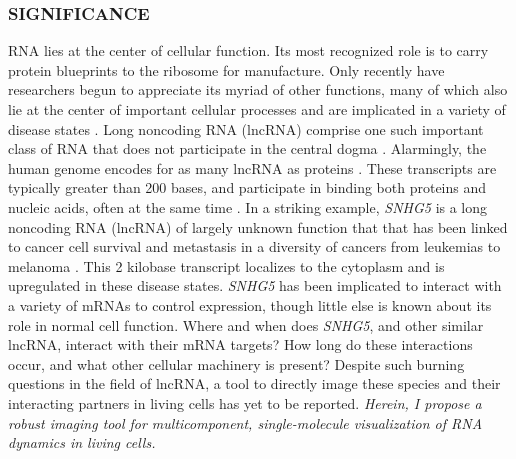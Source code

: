 

\subsubsection*{SIGNIFICANCE}
RNA lies at the center of cellular function. Its most recognized role is to carry protein blueprints to the ribosome for manufacture.
Only recently have researchers begun to appreciate its myriad of other functions, many of which also lie at the center of important cellular processes and are implicated in a variety of disease states \cite{CechNoncodingRNARevolution2014,DellaRagioneNoncodingRNAschromatin2014,AnastasiadouNoncodingRNAnetworks2018}.
Long noncoding RNA (lncRNA) comprise one such important class of RNA that does not participate in the central dogma \cite{RinnGenomeRegulationLong2012}. Alarmingly, the human genome encodes for as many lncRNA as proteins \cite{Rinntranscriptionalactivityhuman2003,RinnGenomeRegulationLong2012}.
These transcripts are typically greater than 200 bases, and participate in binding both proteins and nucleic acids, often at the same time \cite{AnastasiadouNoncodingRNAnetworks2018,RinnGenomeRegulationLong2012}.
In a striking example, \textit{SNHG5} is a long noncoding RNA (lncRNA) of largely unknown function that that has been linked to cancer cell survival and metastasis in a diversity of cancers from leukemias to melanoma \cite{TanakaRitsukoIntronicU50small2001,DamasSNHG5promotescolorectal2016,ZhaoLongnoncodingRNA2016,HeLncRNASNHG5regulates2017,YanSNHG5promotesproliferation2018,MalncRNASNHG5associated2018,ShenLncRNASNHG5miR26a2018,ZhengLongnoncodingRNA2018}.
This 2 kilobase transcript localizes to the cytoplasm and is upregulated in these disease states.
\textit{SNHG5} has been implicated to interact with a variety of mRNAs to control expression, though little else is known about its role in normal cell function.
Where and when does \textit{SNHG5}, and other similar lncRNA, interact with their mRNA targets?
How long do these interactions occur, and what other cellular machinery is present?
Despite such burning questions in the field of lncRNA, a tool to directly image these species and their interacting partners in living cells has yet to be reported. \textit{Herein, I propose a robust imaging tool for multicomponent, single-molecule visualization of RNA dynamics in living cells.}

